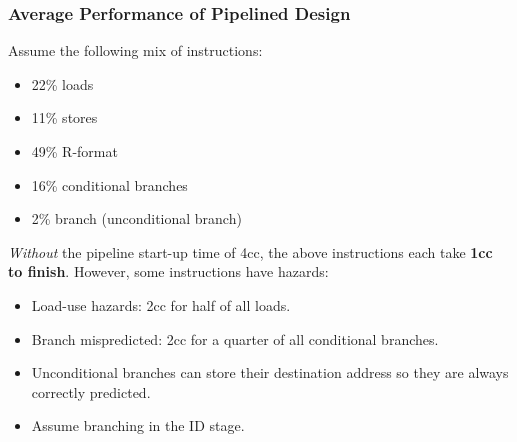 
\begin{frame}\frametitle{Average Performance of Pipelined Design}
Assume the following mix of instructions:
\begin{itemize}
\item 22\% loads
\item 11\% stores
\item 49\% R-format
\item 16\% conditional branches
\item 2\% branch (unconditional branch)
\end{itemize}
\emph{Without} the pipeline start-up time of 4cc, the above instructions each take \textbf{1cc to finish}. However, some instructions have hazards:
\begin{itemize}
\item Load-use hazards: 2cc for half of all loads.
\item Branch mispredicted: 2cc for a quarter of all conditional branches.
\item Unconditional branches can store their destination address so they are always correctly predicted.
\item Assume branching in the ID stage.
\end{itemize}



\end{frame}

